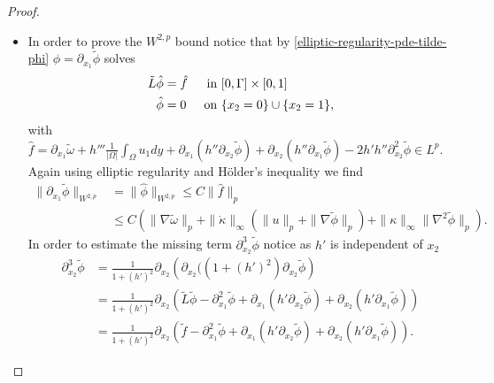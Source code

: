 \documentclass{article}
\theoremstyle{definition}
\theoremstyle{definition}
\begin{document}
\begin{proof}
\begin{itemize}
    \item In order to prove the $W^{2,p}$ bound notice that by \eqref{elliptic-regularity-pde-tilde-phi} $\hat \phi = \partial_{x_1}\tilde \phi$ solves
    \begin{equation*}
        \begin{aligned}
            \tilde L\hat\phi&=\hat f & \textnormal{ in }&[0,\Gamma]\times [0,1]
            \\
            \hat\phi &= 0  & \textnormal{ on }& \lbrace x_2=0\rbrace \cup \lbrace x_2=1\rbrace,
        \end{aligned}
    \end{equation*}
    with $\hat f = \partial_{x_1}\tilde\omega + h'''\frac{1}{|\Omega|}\int_{\Omega} u_1 dy + \partial_{x_1}(h''\partial_{x_2}\tilde \phi)+\partial_{x_2}(h''\partial_{x_1}\tilde \phi) - 2h'h'' \partial_{x_2}^2 \tilde \phi \in L^p$. Again using elliptic regularity and Hölder's inequality we find
    \begin{equation}
        \label{elliptic-regularity-ddx1W2}
        \begin{aligned}
            \|\partial_{x_1}\tilde \phi\|_{W^{2,p}} &= \|\hat\phi\|_{W^{2,p}}\leq C \|\hat f\|_p
            \\
            &\leq C\left(\|\nabla \tilde\omega\|_p + \|\dot\kappa\|_\infty (\|u\|_p + \|\nabla \tilde\phi\|_p) + \|\kappa\|_\infty \|\nabla^2\tilde\phi\|_p\right).
        \end{aligned}
    \end{equation}
    In order to estimate the missing term $\partial_{x_2}^3\tilde \phi$ notice as $h'$ is independent of $x_2$
    \begin{equation}
        \label{elliptic-regularity-dx2hoch3}
        \begin{aligned}
            \partial_{x_2}^3\tilde \phi &= \frac{1}{1+(h')^2}\partial_{x_2} \left(\partial_{x_2}((1+(h')^2)\partial_{x_2}\tilde \phi\right) 
            \\
            &= \frac{1}{1+(h')^2}\partial_{x_2} \left(\tilde L\tilde\phi-\partial_{x_1}^2\tilde \phi +\partial_{x_1}(h'\partial_{x_2}\tilde \phi ) + \partial_{x_2} (h'\partial_{x_1}\tilde \phi)\right)
            \\
            &= \frac{1}{1+(h')^2}\partial_{x_2} \left(\tilde f - \partial_{x_1}^2 \tilde \phi + \partial_{x_1} (h'\partial_{x_2}\tilde \phi)+\partial_{x_2}(h'\partial_{x_1}\tilde \phi)\right).
        \end{aligned}
    \end{equation}

\end{itemize}
\end{proof}
\end{document}
